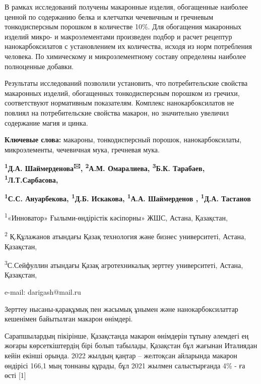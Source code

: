В рамках исследований получены макаронные изделия, обогащенные наиболее
ценной по содержанию белка и клетчатки чечевичным и гречневым
тонкодисперсным порошком в количестве 10\%. Для обогащения макаронных
изделий микро- и макроэлементами произведен подбор и расчет рецептур
нанокарбоксилатов с установлением их количества, исходя из норм
потребления человека. По химическому и микроэлементному составу
определены наиболее полноценные добавки.

Результаты исследований позволили установить, что потребительские
свойства макаронных изделий, обогащенных тонкодисперсным порошком из
гречихи, соответствуют нормативным показателям. Комплекс
нанокарбоксилатов не повлиял на потребительские свойства макарон, но
значительно увеличил содержание магия и цинка.

{\bfseries Ключевые слова:} макароны, тонкодисперсный порошок,
нанокарбоксилаты, микроэлементы, чечевичная мука, гречневая мука.

\begin{center}

{\bfseries \textsuperscript{1}Д.А. Шаймерденова\textsuperscript{🖂},
\textsuperscript{2}А.М. Омаралиева, \textsuperscript{3}Б.К. Тарабаев,
\textsuperscript{1}Л.Т.Сарбасова,}

{\bfseries \textsuperscript{1}С.С. Ануарбекова, \textsuperscript{1}Д.Б.
Искакова, \textsuperscript{1}А.А. Шаймерденов , \textsuperscript{1}Д.А.
Тастанов}

\textsuperscript{1}«Инноватор» Ғылыми-өндірістік кәсіпорны» ЖШС, Астана,
Қазақстан,

\textsuperscript{2} Қ.Құлажанов атындағы Қазақ технология және бизнес
университеті, Астана, Қазақстан,

\textsuperscript{3}С.Сейфуллин атындағы Қазақ агротехникалық зерттеу
университеті, Астана, Қазақстан,

e-mail: darigash@mail.ru
\end{center}

Зерттеу нысаны-қарақұмық пен жасымық ұнымен және нанокарбоксилаттар
кешенімен байытылған макарон өнімдері.

Сарапшылардың пікірінше, Қазақстанда макарон өнімдерін тұтыну әлемдегі
ең жоғары көрсеткіштердің бірі болып табылады, Қазақстан бұл жағынан
Италиядан кейін екінші орында. 2022 жылдың қаңтар -- желтоқсан айларында
макарон өндірісі 166,1 мың тоннаны құрады, бұл 2021 жылмен салыстырғанда
4\% - ға өсті {[}1{]}

